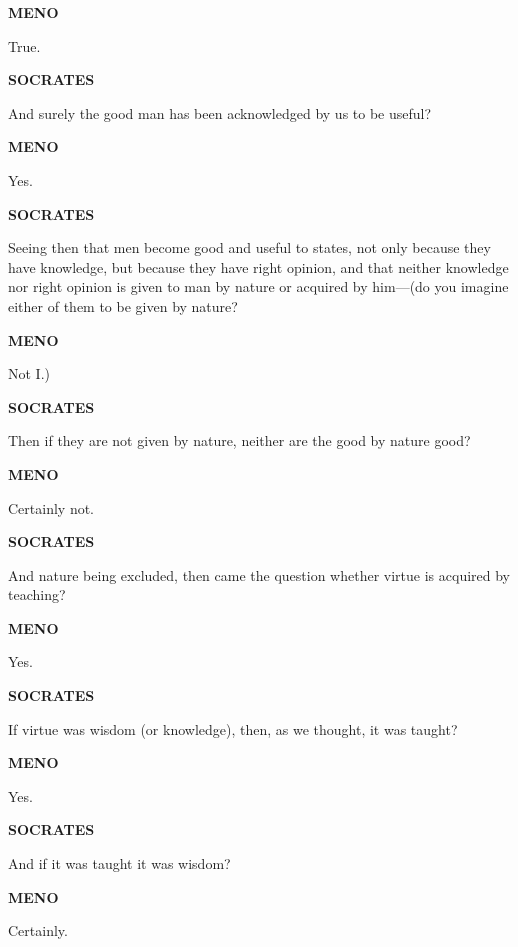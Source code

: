 \documentclass[11pt,letter]{article}
\begin{document}
\par \textbf{MENO}
\par   True.

\par \textbf{SOCRATES}
\par   And surely the good man has been acknowledged by us to be useful?

\par \textbf{MENO}
\par   Yes.

\par \textbf{SOCRATES}
\par   Seeing then that men become good and useful to states, not only because they have knowledge, but because they have right opinion, and that neither knowledge nor right opinion is given to man by nature or acquired by him—(do you imagine either of them to be given by nature?

\par \textbf{MENO}
\par   Not I.)

\par \textbf{SOCRATES}
\par   Then if they are not given by nature, neither are the good by nature good?

\par \textbf{MENO}
\par   Certainly not.

\par \textbf{SOCRATES}
\par   And nature being excluded, then came the question whether virtue is acquired by teaching?

\par \textbf{MENO}
\par   Yes.

\par \textbf{SOCRATES}
\par   If virtue was wisdom (or knowledge), then, as we thought, it was taught?

\par \textbf{MENO}
\par   Yes.

\par \textbf{SOCRATES}
\par   And if it was taught it was wisdom?

\par \textbf{MENO}
\par   Certainly.
\end{document}
